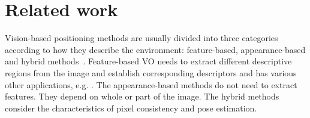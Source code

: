 \documentclass[letterpaper, 10 pt, conference]{ieeeconf}  %
\begin{document}
\section{Related work}
Vision-based positioning methods are usually divided into three categories according to how they describe the environment: feature-based, appearance-based and hybrid methods~\cite{scaramuzza2011visual}. Feature-based VO needs to extract different descriptive regions from the image and establish corresponding descriptors \cite{Mur_Artal_2015,Rosten_2010,790410} and has various other applications, e.g. \cite{chavez2019adaptive}. The appearance-based methods do not need to extract features. They depend on whole or part of the image. The hybrid methods consider the characteristics of pixel consistency and pose estimation.
\end{document}

